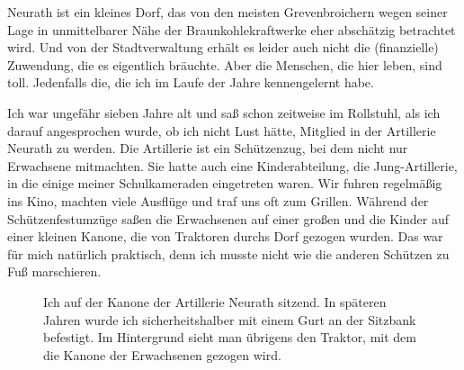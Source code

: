 \documentclass[fontsize=14pt,a4paper,headinclude,DIV=calc,automark]{scrbook}
\begin{document}
Neurath ist ein kleines Dorf, das von den meisten Grevenbroichern wegen seiner Lage in unmittelbarer Nähe der Braunkohlekraftwerke eher abschätzig betrachtet wird. Und von der Stadtverwaltung erhält es leider auch nicht die (finanzielle) Zuwendung, die es eigentlich bräuchte. Aber die Menschen, die hier leben, sind toll. Jedenfalls die, die ich im Laufe der Jahre kennengelernt habe.

Ich war ungefähr sieben Jahre alt und saß schon zeitweise im Rollstuhl, als ich darauf angesprochen wurde, ob ich nicht Lust hätte, Mitglied in der Artillerie Neurath zu werden. Die Artillerie ist ein Schützenzug, bei dem nicht nur Erwachsene mitmachten. Sie hatte auch eine Kinderabteilung, die Jung-Artillerie, in die einige meiner Schulkameraden eingetreten waren. Wir fuhren regelmäßig ins Kino, machten viele Ausflüge und traf uns oft zum Grillen. Während der Schützenfestumzüge saßen die Erwachsenen auf einer großen und die Kinder auf einer kleinen Kanone, die von Traktoren durchs Dorf gezogen wurden. Das war für mich natürlich praktisch, denn ich musste nicht wie die anderen Schützen zu Fuß marschieren.

\setlength{\fboxsep}{0pt}    %
\setlength{\fboxrule}{0.2pt} %
\begin{figure}[ht]
    \centering
    \caption{Ich auf der Kanone der Artillerie Neurath sitzend. In späteren Jahren wurde ich sicherheitshalber mit einem Gurt an der Sitzbank befestigt. Im Hintergrund sieht man übrigens den Traktor, mit dem die Kanone der Erwachsenen gezogen wird.}
    \label{fig:schützenfest}
\end{figure}
\end{document}
